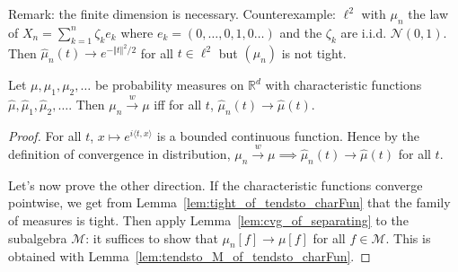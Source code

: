 Remark: the finite dimension is necessary.
Counterexample: $\ell^2$ with $\mu_n$ the law of $X_n = \sum_{k=1}^n \zeta_k e_k$ where $e_k = (0, \ldots, 0, 1, 0 \ldots)$ and the $\zeta_k$ are i.i.d. $\mathcal N(0,1)$.
Then $\hat{\mu}_n(t) \to e^{- \Vert t \Vert^2 / 2}$ for all $t \in \ell^2$ but $(\mu_n)$ is not tight.


\begin{theorem}
\label{thm:charFun_tendsto_iff_measure_tendsto}
\leanok
{}
Let $\mu, \mu_1, \mu_2, \ldots$ be probability measures on $\mathbb{R}^d$ with characteristic functions $\hat{\mu}, \hat{\mu}_1, \hat{\mu}_2, \ldots$. Then $\mu_n \xrightarrow{w} \mu$ iff for all $t$, $\hat{\mu}_n(t) \to \hat{\mu}(t)$.
\end{theorem}

\begin{proof}
\leanok
For all $t$, $x \mapsto e^{i \langle t, x \rangle}$ is a bounded continuous function. Hence by the definition of convergence in distribution, $\mu_n \xrightarrow{w} \mu \implies \hat{\mu}_n(t) \to \hat{\mu}(t)$ for all $t$.

Let's now prove the other direction.
If the characteristic functions converge pointwise, we get from Lemma~\ref{lem:tight_of_tendsto_charFun} that the family of measures is tight.
Then apply Lemma~\ref{lem:cvg_of_separating} to the subalgebra $\mathcal M$: it suffices to show that $\mu_n[f] \to \mu[f]$ for all $f \in \mathcal M$. This is obtained with Lemma~\ref{lem:tendsto_M_of_tendsto_charFun}.
\end{proof}